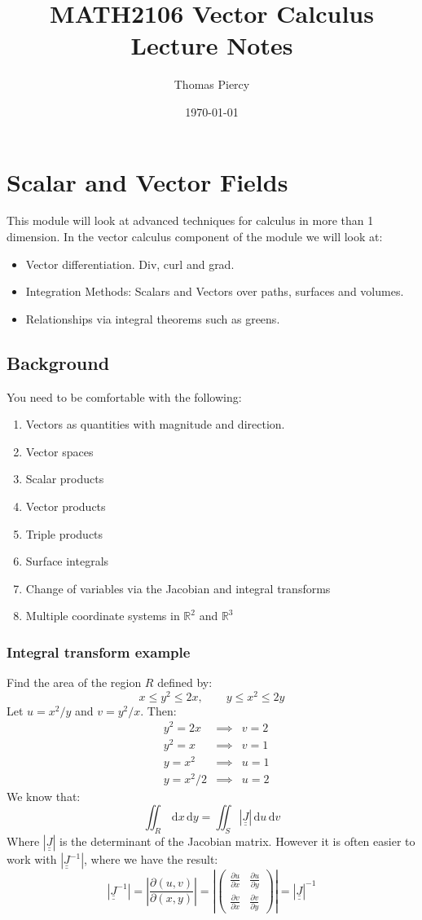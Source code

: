 \documentclass[12pt]{article}
\title{\textbf{MATH2106 Vector Calculus Lecture Notes}}
\author{Thomas Piercy}
\date{\today{}}
\newcommand{\pf}[2]{\frac{\partial #1}{\partial #2}}
\begin{document}
\maketitle
\hrulefill
\tableofcontents
\newpage
{}
\section{Scalar and Vector Fields}
This module will look at advanced techniques for calculus in more than 1 dimension. In the vector calculus component of the module we will look at:
\begin{itemize}
    \item Vector differentiation. Div, curl and grad.
    \item Integration Methods: Scalars and Vectors over paths, surfaces and volumes.
    \item Relationships via integral theorems such as greens.
\end{itemize}
\subsection{Background}
You need to be comfortable with the following:
\begin{enumerate}
    \item Vectors as quantities with magnitude and direction.
    \item Vector spaces
    \item Scalar products
    \item Vector products
    \item Triple products
    \item Surface integrals
    \item Change of variables via the Jacobian and integral transforms
    \item Multiple coordinate systems in \(\mathbb{R}^2\) and \(\mathbb{R}^3\)
\end{enumerate}
\subsubsection{Integral transform example}
Find the area of the region \(R\) defined by:
\[x\leq y^2\leq 2x,\qquad y\leq x^2\leq 2y\]
Let \(u=x^2/y\) and \(v=y^2/x\). Then:
\begin{align*}
    &y^2=2x&\implies &v=2 \\
    &y^2=x&\implies &v=1 \\
    &y=x^2&\implies&u=1 \\
    &y=x^2/2&\implies&u=2
\end{align*}
We know that:
\[\iint_R\,\text{d}x\,\text{d}y=\iint_{S}|\underline{\underline{J}}|\,\text{d}u\,\text{d}v\]
Where \(|\underline{\underline{J}}|\) is the determinant of the Jacobian matrix. However it is often easier to work with \(|\underline{\underline{J}}^{-1}|\), where we have the result:
\[|\underline{\underline{J}}^{-1}|=\left|\pf{(u,v)}{(x,y)}\right|=\left|\begin{pmatrix}
    \pf{u}{x} & \pf{u}{y} \\ \pf{v}{x} & \pf{v}{y}
\end{pmatrix}\right|=|\underline{\underline{J}}|^{-1}\]
\end{document}

